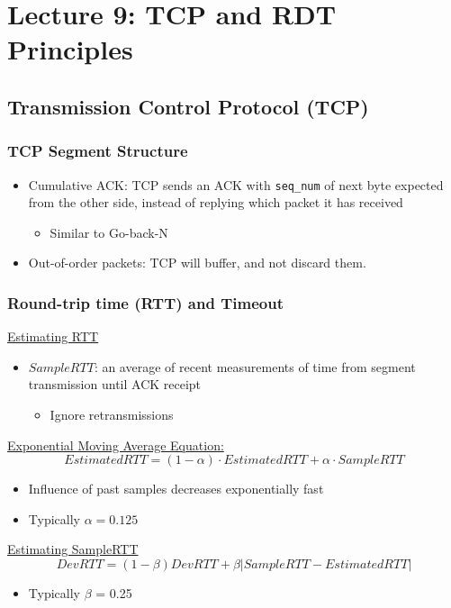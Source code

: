 \documentclass[a4paper]{article}
\begin{document}
\newpage
\section{Lecture 9: TCP and RDT Principles}
\subsection{Transmission Control Protocol (TCP)}
\subsubsection{TCP Segment Structure}
\begin{itemize}
    \item Cumulative ACK: TCP sends an ACK with \texttt{seq\_num} of next byte expected from the other side, instead of replying which packet it has received
    \begin{itemize}[label=$\circ$]
        \item Similar to Go-back-N    
    \end{itemize}
    \item Out-of-order packets: TCP will buffer, and not discard them.
\end{itemize}

\subsubsection{Round-trip time (RTT) and Timeout}
\underline{Estimating RTT}
\begin{itemize}
    \item $SampleRTT$: an average of recent measurements of time from segment transmission until ACK receipt
    \begin{itemize}[label=$\circ$]
        \item Ignore retransmissions
    \end{itemize}
\end{itemize}
\noindent\underline{Exponential Moving Average Equation:}
$$EstimatedRTT = (1-\alpha)\cdot EstimatedRTT + \alpha\cdot SampleRTT$$
\begin{itemize}
    \item Influence of past samples decreases exponentially fast
    \item Typically $\alpha=0.125$
\end{itemize}

\noindent\underline{Estimating SampleRTT}
$$ DevRTT = (1-\beta)DevRTT + \beta|SampleRTT-EstimatedRTT| $$
\begin{itemize}
    \item Typically $\beta$ = 0.25
\end{itemize}
\end{document}
